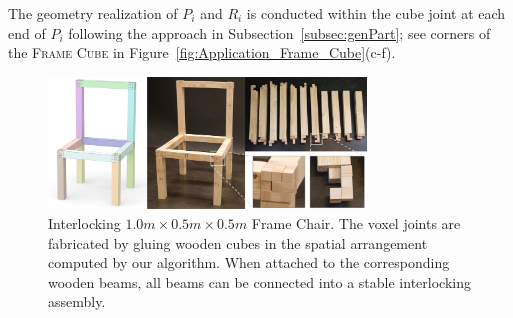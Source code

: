 \begin{itemize}[leftmargin=*]
	
	The geometry realization of $P_i$ and $R_i$ is conducted within the cube joint at each end of $P_i$ following the approach in Subsection~\ref{subsec:genPart}; see corners of the \textsc{Frame Cube} in Figure~\ref{fig:Application_Frame_Cube}(c-f).
\end{itemize}

\begin{figure}[!t]
	\centering
	\includegraphics[width=8.45cm]{images/Result_Frame_Physical.png}
	\vspace*{-2.5mm}
	\caption{
		Interlocking $1.0m \times 0.5m \times 0.5m$ {\textsc Frame Chair}. The voxel joints are fabricated by gluing wooden cubes in the spatial arrangement computed by our algorithm. When attached to the corresponding wooden beams, all beams can be connected into a stable interlocking assembly.}
	\vspace*{-4.0mm}
	\label{fig:Result_Frame_Physical}
\end{figure}

